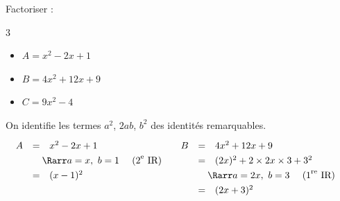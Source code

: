 \begin{methode}
	Factoriser :
	\begin{multicols}{3}
		\begin{itemize}
			\item $A = x^2 - 2x + 1$
			\item $B = 4x^2 + 12x + 9$
			\item $C = 9x^2 - 4$
		\end{itemize}
	\end{multicols}

	\begin{correction}
		On identifie les termes $a^2$, $2ab$, $b^2$ des identités remarquables.
		\[
			\begin{array}{lll}%
				\def\arraystretch{1.3}%
				\begin{array}{rcl}%
					A & =                                                                            & x^2 - 2x + 1 \\
					  & \multicolumn{2}{l}{\quad\Rarr a=x,\ b=1 \quad\text{ (2}^\text{e}\text{ IR)}}                \\
					  & =                                                                            & (x - 1)^2    \\
					  &                                                                              &              \\
				\end{array}                         &                         %
				\def\arraystretch{1.3}%
				\begin{array}{rcl}%
					B & =                                                                              & 4x^2 + 12x + 9                      \\
					  & =                                                                              & (2x)^2 + 2 \times 2x \times 3 + 3^2 \\
					  & \multicolumn{2}{l}{\quad\Rarr a=2x,\ b=3 \quad\text{ (1}^\text{re}\text{ IR)}}                                       \\
					  & =                                                                              & (2x + 3)^2                          \\
				\end{array} & %
				\def\arraystretch{1.3}%
				\begin{array}{rcl}%

\end{array}
\end{array}\]
\end{correction}
\end{methode}
